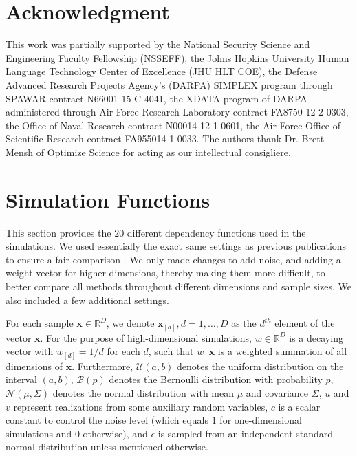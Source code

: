 \documentclass[11pt]{article}
\providecommand{\mb}[1]{\boldsymbol{#1}}
\providecommand{\mc}[1]{\mathcal{#1}}
\newcommand{\Real}{\mathbb{R}}
\newcommand{\T}{^{\ensuremath{\mathsf{T}}}}           %
\newcommand{\mbx}{\ensuremath{\mb{x}}}
\begin{document}
\clearpage
\pagestyle{plain}




\section*{Acknowledgment}
This work was partially supported by the
%
National Security Science and Engineering Faculty Fellowship (NSSEFF),
%
the Johns Hopkins University Human Language Technology Center of Excellence (JHU HLT COE),  the
%
Defense Advanced Research Projects Agency's (DARPA) SIMPLEX program through SPAWAR contract N66001-15-C-4041,
%
the XDATA program of DARPA administered through Air Force Research Laboratory contract FA8750-12-2-0303,
%
the Office of Naval Research contract N00014-12-1-0601,
%
the Air Force Office of Scientific Research contract FA955014-1-0033. The authors thank Dr. Brett Mensh of Optimize Science for acting as our intellectual consigliere.


\clearpage
\appendix
\setcounter{figure}{0}
\renewcommand\thefigure{A\arabic{figure}}

\section{Simulation Functions}
\label{appen:function}

This section provides the $20$ different dependency functions used in the simulations.  We used essentially the exact same settings as previous publications to ensure a fair comparison \cite{SzekelyRizzoBakirov2007, SimonTibshirani2012, SimonTibshirani2012, GorfineHellerHeller2012}.  We only made changes to add noise, and adding a weight vector for higher dimensions, thereby making them more difficult, to better compare all methods throughout different dimensions and sample sizes. We also included a few additional settings.

For each sample $\mb{x} \in \Real^{D}$, we denote $\mb{x}_{[d]}, d=1,\ldots,D$ as the $d^{th}$ element of the vector  \mbx. For the purpose of high-dimensional simulations, $w \in \Real^{D}$ is a decaying vector with $w_{[d]}=1/d$ for each $d$, such that $w\T \mb{x}$ is a 
weighted summation of all dimensions of \mbx. %
Furthermore, $\mc{U}(a,b)$ denotes the uniform distribution on the interval $(a,b)$, $\mc{B}(p)$ denotes the Bernoulli distribution with probability $p$, $\mc{N}(\mu,{\Sigma})$ denotes the normal distribution with mean ${\mu}$ and covariance ${\Sigma}$, 
$u$ and $v$ represent realizations from some auxiliary random variables, $c$ is a scalar constant to control the noise level (which equals $1$ for one-dimensional simulations and $0$ otherwise), and $\epsilon$ is sampled from an independent standard normal distribution unless mentioned otherwise.
\end{document}
